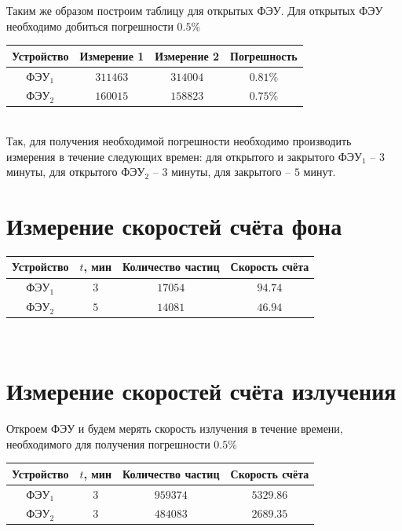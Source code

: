 \documentclass[12pt]{article}
\begin{document}
    Таким же образом построим таблицу для открытых ФЭУ. Для открытых ФЭУ
    необходимо добиться погрешности $0.5 \%$ \\

    \begin{tabular}{ || c || c | c | c ||}
      \hline
      Устройство & Измерение 1 & Измерение 2 & Погрешность \\ \hline
      ФЭУ$_1$ & $311463$ & $314004$ & $0.81 \%$ \\
      ФЭУ$_2$ & $160015$ & $158823$ & $0.75 \%$ \\
      \hline
    \end{tabular} \\

    Так, для получения необходимой погрешности необходимо производить измерения
    в течение следующих времен: для открытого и закрытого ФЭУ$_1$ -- $3$ минуты,
    для открытого ФЭУ$_2$ -- $3$ минуты, для закрытого -- $5$ минут.


  \section{Измерение скоростей счёта фона}

    \begin{tabular}{ || c || c | c | c ||}
      \hline
      Устройство & $t$, мин & Количество частиц & Скорость счёта \\ \hline
      ФЭУ$_1$ & $3$ & $17054$ & $94.74$ \\
      ФЭУ$_2$ & $5$ & $14081$ & $46.94$ \\
      \hline
    \end{tabular} \\


  \section{Измерение скоростей счёта излучения}

    Откроем ФЭУ и будем мерять скорость излучения в течение времени,
    необходимого для получения погрешности $0.5 \%$ \\

    \begin{tabular}{ || c || c | c | c ||}
      \hline
      Устройство & $t$, мин & Количество частиц & Скорость счёта \\ \hline
      ФЭУ$_1$ & $3$ & $959374$ & $5329.86$ \\
      ФЭУ$_2$ & $3$ & $484083$ & $2689.35$ \\
      \hline
    \end{tabular} \\
\end{document}
